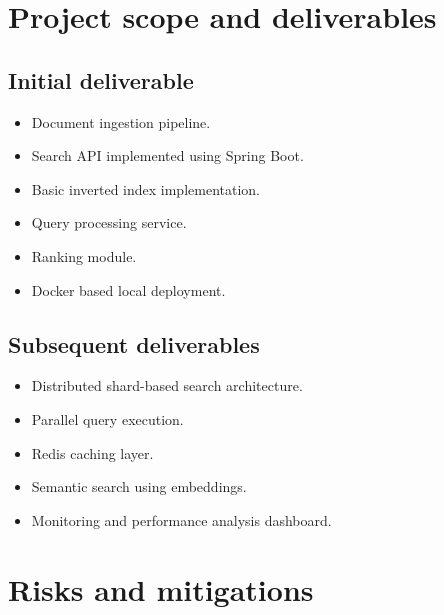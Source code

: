 \documentclass[11pt]{article}
\begin{document}
\section{Project scope and deliverables}

\subsection{Initial deliverable}

\begin{itemize}

\item Document ingestion pipeline.

\item Search API implemented using Spring Boot.

\item Basic inverted index implementation.

\item Query processing service.

\item Ranking module.

\item Docker based local deployment.

\end{itemize}


\subsection{Subsequent deliverables}

\begin{itemize}

\item Distributed shard-based search architecture.

\item Parallel query execution.

\item Redis caching layer.

\item Semantic search using embeddings.

\item Monitoring and performance analysis dashboard.

\end{itemize}


\section{Risks and mitigations}
\end{document}
